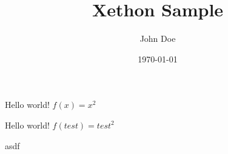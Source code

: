 \documentclass[a4j,12pt]{jreport}
\title{Xethon Sample}
\author{John Doe}
\date{\today}
\begin{document}
\maketitle


Hello world! $f(x) = x^2$

Hello world! $f(test) = test^2$

asdf
\end{document}
